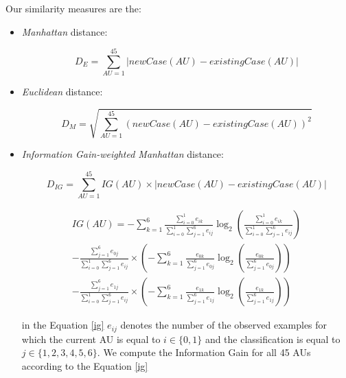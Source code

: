 \documentclass[a4paper]{article}
\begin{document}
Our similarity measures are the:
\begin{itemize}

\item \emph{Manhattan} distance:

\begin{equation}
D_E = \sum_{AU = 1}^{45} \left | newCase(AU) - existingCase(AU)\right |
\end{equation}

\item \emph{Euclidean} distance:

\begin{equation}
D_M = \sqrt{ \sum_{AU = 1}^{45} \left ( newCase(AU) - existingCase(AU)\right )^{2} }
\end{equation}

\item \emph{Information Gain-weighted Manhattan} distance:

\begin{equation}
D_{IG} = \sum_{AU = 1}^{45} IG(AU)\times \left | newCase(AU) - existingCase(AU)\right |
\end{equation}

\begin{equation}
\begin{split}
IG(AU) = -\sum_{k=1}^{6} \frac{ \sum_{i=0}^{1} e_{ik} }{ \sum_{i=0}^{1} \sum_{j=1}^{6} e_{ij} } \log_{2} \left ( \frac{ \sum_{i=0}^{1} e_{ik} }{ \sum_{i=0}^{1} \sum_{j=1}^{6} e_{ij} } \right ) \\
- \frac{ \sum_{j=1}^{6} e_{0j} }{ \sum_{i=0}^{1} \sum_{j=1}^{6} e_{ij} } \times \left ( - \sum_{k=1}^{6} \frac{ e_{0k} }{ \sum_{j=1}^{6} e_{0j} } \log_{2} \left ( \frac{ e_{0k} }{ \sum_{j=1}^{6} e_{0j} } \right ) \right ) \\
- \frac{ \sum_{j=1}^{6} e_{1j} }{ \sum_{i=0}^{1} \sum_{j=1}^{6} e_{ij} } \times \left ( - \sum_{k=1}^{6} \frac{ e_{1k} }{ \sum_{j=1}^{6} e_{1j} } \log_{2} \left ( \frac{ e_{1k} }{ \sum_{j=1}^{6} e_{1j} } \right ) \right )
\end{split}
\label{ig}
\end{equation}

in the Equation \ref{ig} $e_{ij}$ denotes the number of the observed examples for which the current AU is equal to $i \in \{0,1\}$ and the classification is equal to $j \in \{1,2,3,4,5,6\}$. We compute the Information Gain for all 45 AUs according to the Equation \ref{ig}

\end{itemize}
\end{document}
